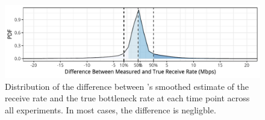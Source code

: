 \begin{figure}
    \centering
\begin{knitrout}
\color{fgcolor}
\includegraphics[width=\maxwidth]{figure/micro:thru-1} 

\end{knitrout}
    \caption{Distribution of the difference between \name's smoothed estimate of the receive rate and 
    the true bottleneck rate at each time point across all experiments. In most cases, the difference
    is negligble.}
    \label{fig:micro:thru}
\end{figure}
